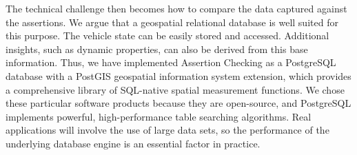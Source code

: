 The technical challenge then becomes how to compare the data captured against the assertions. We argue that a geospatial relational database is well suited for this purpose. The vehicle state can be easily stored and accessed. Additional insights, such as dynamic properties, can also be derived from this base information. 
%
Thus, we have implemented Assertion Checking as a PostgreSQL database with a PostGIS geospatial information system extension, which provides a comprehensive library of SQL-native spatial measurement functions. We chose these particular software products because they are open-source, and PostgreSQL implements powerful, high-performance table searching algorithms.
Real applications will involve the use of large data sets, so the performance of the underlying database engine is an essential factor in practice. %





